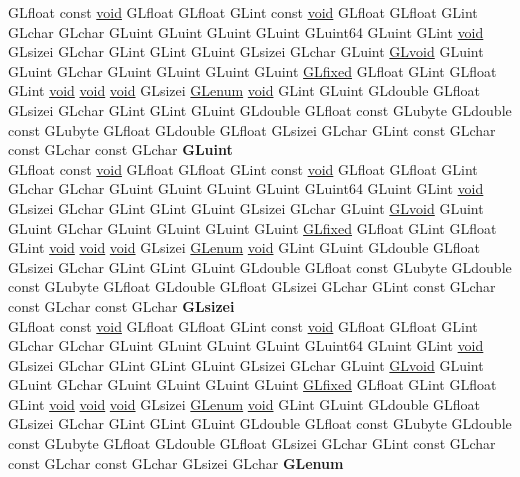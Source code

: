 \begin{DoxyCompactItemize}
\begin{tabbing}
\>GLfloat const \hyperlink{interfacevoid}{void} GLfloat GLfloat GLint const \hyperlink{interfacevoid}{void} GLfloat GLfloat GLint GLchar GLchar GLuint GLuint GLuint GLuint GLuint64 GLuint GLint \hyperlink{interfacevoid}{void} GLsizei GLchar GLint GLint GLuint GLsizei GLchar GLuint \hyperlink{interfacevoid}{GLvoid} GLuint GLuint GLchar GLuint GLuint GLuint GLuint \hyperlink{glheader_8h_ad6d3fa892df40dedf48ee6d84529ae5e}{GLfixed} GLfloat GLint GLfloat GLint \hyperlink{interfacevoid}{void} \hyperlink{interfacevoid}{void} \hyperlink{interfacevoid}{void} GLsizei \hyperlink{interfacevoid}{GLenum} \hyperlink{interfacevoid}{void} GLint GLuint GLdouble GLfloat GLsizei GLchar GLint GLint GLuint GLdouble GLfloat const GLubyte GLdouble const GLubyte GLfloat GLdouble GLfloat GLsizei GLchar GLint const GLchar const GLchar const GLchar {\bfseries GLuint}\\
\>GLfloat const \hyperlink{interfacevoid}{void} GLfloat GLfloat GLint const \hyperlink{interfacevoid}{void} GLfloat GLfloat GLint GLchar GLchar GLuint GLuint GLuint GLuint GLuint64 GLuint GLint \hyperlink{interfacevoid}{void} GLsizei GLchar GLint GLint GLuint GLsizei GLchar GLuint \hyperlink{interfacevoid}{GLvoid} GLuint GLuint GLchar GLuint GLuint GLuint GLuint \hyperlink{glheader_8h_ad6d3fa892df40dedf48ee6d84529ae5e}{GLfixed} GLfloat GLint GLfloat GLint \hyperlink{interfacevoid}{void} \hyperlink{interfacevoid}{void} \hyperlink{interfacevoid}{void} GLsizei \hyperlink{interfacevoid}{GLenum} \hyperlink{interfacevoid}{void} GLint GLuint GLdouble GLfloat GLsizei GLchar GLint GLint GLuint GLdouble GLfloat const GLubyte GLdouble const GLubyte GLfloat GLdouble GLfloat GLsizei GLchar GLint const GLchar const GLchar const GLchar {\bfseries GLsizei}\\
\>GLfloat const \hyperlink{interfacevoid}{void} GLfloat GLfloat GLint const \hyperlink{interfacevoid}{void} GLfloat GLfloat GLint GLchar GLchar GLuint GLuint GLuint GLuint GLuint64 GLuint GLint \hyperlink{interfacevoid}{void} GLsizei GLchar GLint GLint GLuint GLsizei GLchar GLuint \hyperlink{interfacevoid}{GLvoid} GLuint GLuint GLchar GLuint GLuint GLuint GLuint \hyperlink{glheader_8h_ad6d3fa892df40dedf48ee6d84529ae5e}{GLfixed} GLfloat GLint GLfloat GLint \hyperlink{interfacevoid}{void} \hyperlink{interfacevoid}{void} \hyperlink{interfacevoid}{void} GLsizei \hyperlink{interfacevoid}{GLenum} \hyperlink{interfacevoid}{void} GLint GLuint GLdouble GLfloat GLsizei GLchar GLint GLint GLuint GLdouble GLfloat const GLubyte GLdouble const GLubyte GLfloat GLdouble GLfloat GLsizei GLchar GLint const GLchar const GLchar const GLchar GLsizei GLchar {\bfseries GLenum}\\

\end{tabbing}
\end{DoxyCompactItemize}
